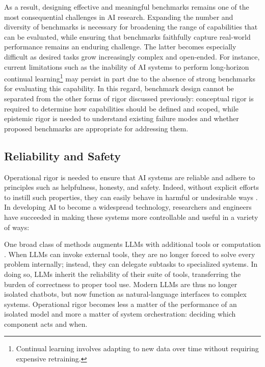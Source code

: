 \documentclass{article}
\begin{document}
As a result, designing effective and meaningful benchmarks remains one of the most consequential challenges in AI research.
Expanding the number and diversity of benchmarks is necessary for broadening the range of capabilities that can be evaluated, while ensuring that benchmarks faithfully capture real-world performance remains an enduring challenge.
The latter becomes especially difficult as desired tasks grow increasingly complex and open-ended.
For instance, current limitations such as the inability of AI systems to perform long-horizon continual learning\footnote{Continual learning involves adapting to new data over time without requiring expensive retraining.} may persist in part due to the absence of strong benchmarks for evaluating this capability.
In this regard, benchmark design cannot be separated from the other forms of rigor discussed previously: conceptual rigor is required to determine how capabilities should be defined and scoped, while epistemic rigor is needed to understand existing failure modes and whether proposed benchmarks are appropriate for addressing them.




\subsection{Reliability and Safety}

Operational rigor is needed to ensure that AI systems are reliable and adhere to principles such as helpfulness, honesty, and safety.
Indeed, without explicit efforts to instill such properties, they can easily behave in harmful or undesirable ways \cite{gehman2020realtoxicityprompts, elatillah2023ai}.
In developing AI to become a widespread technology, researchers and engineers have succeeded in making these systems more controllable and useful in a variety of ways:

One broad class of methods augments LLMs with additional tools or computation \cite{Schick2023Toolformer}.
When LLMs can invoke external tools, they are no longer forced to solve every problem internally; instead, they can delegate subtasks to specialized systems.
In doing so, LLMs inherit the reliability of their suite of tools, transferring the burden of correctness to proper tool use.
Modern LLMs are thus no longer isolated chatbots, but now function as natural-language interfaces to complex systems.
Operational rigor becomes less a matter of the performance of an isolated model and more a matter of system orchestration: deciding which component acts and when.
\end{document}
